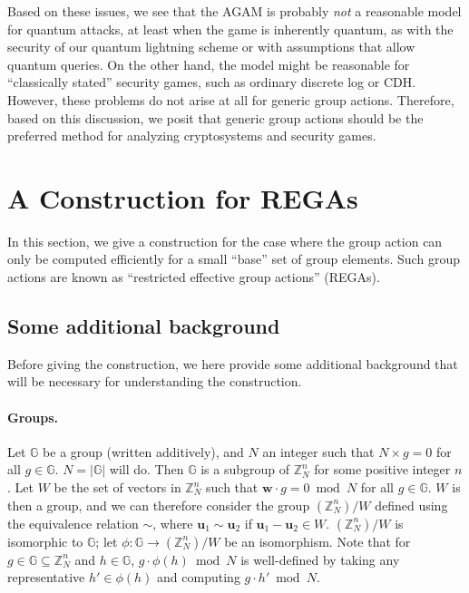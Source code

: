 \documentclass{article}\usepackage[a4paper,margin=20mm]{geometry}
\numberwithin{theorem}{section}
\numberwithin{equation}{section}
\newcommand{\Z}{\mathbb{Z}}
\newcommand{\G}{\mathbb{G}}
\newcommand{\uv}{{\mathbf{u}}}
\newcommand{\wv}{{\mathbf{w}}}
\begin{document}
\medskip

Based on these issues, we see that the AGAM is probably \emph{not} a reasonable model for quantum attacks, at least when the game is inherently quantum, as with the security of our quantum lightning scheme or with assumptions that allow quantum queries. On the other hand, the model might be reasonable for ``classically stated'' security games, such as ordinary discrete log or CDH. However, these problems do not arise at all for generic group actions. Therefore, based on this discussion, we posit that generic group actions should be the preferred method for analyzing cryptosystems and security games.






\section{A Construction for REGAs}\label{sec:alternate}

In this section, we give a construction for the case where the group action can only be computed efficiently for a small ``base'' set of group elements. Such group actions are known as ``restricted effective group actions'' (REGAs). 

\subsection{Some additional background}

Before giving the construction, we here provide some additional background that will be necessary for understanding the construction.

\paragraph{Groups.} Let $\G$ be a group (written additively), and $N$ an integer such that $N\times g=0$ for all $g\in\G$. $N=|\G|$ will do. Then $\G$ is a subgroup of $\Z_N^n$ for some positive integer $n$. Let $W$ be the set of vectors in $\Z_N^n$ such that $\wv\cdot g=0\bmod N$ for all $g\in\G$. $W$ is then a group, and we can therefore consider the group $(\Z_N^n)/W$ defined using the equivalence relation $\sim$, where $\uv_1\sim\uv_2$ if $\uv_1-\uv_2\in W$. $(\Z_N^n)/W$ is isomorphic to $\G$; let $\phi:\G\rightarrow(\Z_N^n)/W$ be an isomorphism. Note that for $g\in\G\subseteq\Z_N^n$ and $h\in \G$, $g\cdot\phi(h)\bmod N$ is well-defined by taking any representative $h'\in\phi(h)$ and computing $g\cdot h'\bmod N$.
\end{document}

